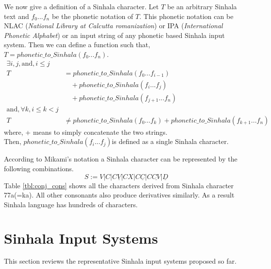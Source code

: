 \documentclass[english]{jnlp_1.3e}
\begin{document}
We now give a definition of  a  Sinhala character. 
Let $T$ be an arbitrary Sinhala text and $f_{0}...f_{n}$ be the phonetic notation of $T$. This phonetic
notation can be NLAC ({\it National Library at Calcutta romanization}) or IPA ({\it International Phonetic
Alphabet}) or an input string of any phonetic based Sinhala input system. Then we can
define a function such that, $T = \mathit{phonetic\_to\_Sinhala}(f_{0}...f_{n})$.
\begin{align}
\exists i,j , \text{and}, i\leq j & \nonumber \\
T&=\mathit{phonetic\_to\_Sinhala}(f_{0}...f_{i-1})\nonumber \\
 & \quad {} + \mathit{phonetic\_to\_Sinhala}(f_{i}...f_{j})\nonumber \\
 & \quad {} + \mathit{phonetic\_to\_Sinhala}(f_{j+1}...f_{n})\\
\text{and}, \forall k, i\leq k<j &\nonumber\\
T &\neq \mathit{phonetic\_to\_Sinhala}(f_{0}...f_{k})+\mathit{phonetic\_to\_Sinhala}(f_{k+1}...f_{n})
\end{align}
where, + means to simply  concatenate  the two strings.\\
Then, $\mathit{phonetic\_to\_Sinhala}(f_{i}...f_{j})$is defined as a single Sinhala character.

According to Mikami's notation  a  Sinhala  character  can be represented by the following combinations.
\begin{equation}
S:=V|C|C\underline{V}|CX|C\underline{C}|C\underline{CV}|\underline{D}
\end{equation}
Table \ref{tbl:conj_cons} shows all the characters derived from Sinhala character {\SHa\char77a}(=ka). 
All other consonants also produce derivatives similarly. 
As a result Sinhala language has hundreds of characters.

\begin{table}[t]
\caption{Conjunct consonants derived from {\SHa\char77a}(=ka)}
\label{tbl:conj_cons}

\end{table}




\section{Sinhala Input Systems}
\label{related_work}

This section reviews the representative Sinhala input systems proposed so far.
\end{document}
